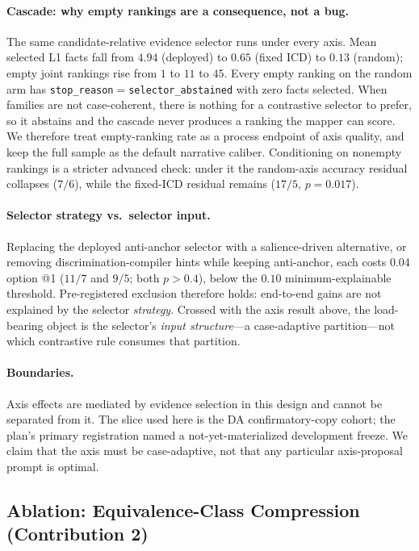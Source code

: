 \paragraph{Cascade: why empty rankings are a consequence, not a bug.}
The same candidate-relative evidence selector runs under every axis.
Mean selected L1 facts fall from $4.94$ (deployed) to $0.65$ (fixed ICD) to $0.13$ (random); empty joint rankings rise from $1$ to $11$ to $45$.
Every empty ranking on the random arm has \texttt{stop\_reason}${=}$\texttt{selector\_abstained} with zero facts selected.
When families are not case-coherent, there is nothing for a contrastive selector to prefer, so it abstains and the cascade never produces a ranking the mapper can score.
We therefore treat empty-ranking rate as a process endpoint of axis quality, and keep the full sample as the default narrative caliber.
Conditioning on nonempty rankings is a stricter advanced check: under it the random-axis accuracy residual collapses ($7/6$), while the fixed-ICD residual remains ($17/5$, $p{=}0.017$).

\paragraph{Selector strategy vs.\ selector input.}
Replacing the deployed anti-anchor selector with a salience-driven alternative, or removing discrimination-compiler hints while keeping anti-anchor, each costs $0.04$ option @1 ($11/7$ and $9/5$; both $p{>}0.4$), below the $0.10$ minimum-explainable threshold.
Pre-registered exclusion therefore holds: end-to-end gains are not explained by the selector \emph{strategy}.
Crossed with the axis result above, the load-bearing object is the selector's \emph{input structure}---a case-adaptive partition---not which contrastive rule consumes that partition.

\paragraph{Boundaries.}
Axis effects are mediated by evidence selection in this design and cannot be separated from it.
The slice used here is the DA confirmatory-copy cohort; the plan's primary registration named a not-yet-materialized development freeze.
We claim that the axis must be case-adaptive, not that any particular axis-proposal prompt is optimal.

\subsection{Ablation: Equivalence-Class Compression (Contribution 2)}
\label{sec:res-eq}

